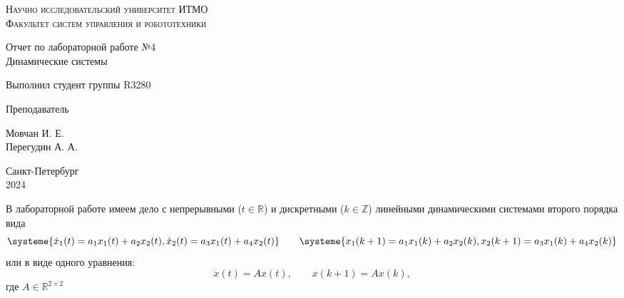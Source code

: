 \documentclass[a4paper,14pt]{extarticle}
\begin{document}
	\begin{titlepage}
		
		\setlength{\parindent}{0ex}
		
		\begin{center}
			\textsc{
				\vspace{1ex}
				Научно исследовательский университет ИТМО \\
				\vspace{0.5ex}
				Факультет систем управления и робототехники \\
				\vspace{0.5ex}
			}
		\end{center}
		
		\vspace{50mm}
		
		\begin{center}
			Отчет по лабораторной работе №4 \\
			Динамические системы
		\end{center}
		
		\vspace{50mm}
		
		\begin{minipage}{.55\linewidth}
			Выполнил студент группы R3280
			
			\smallskip
			
			Преподаватель
		\end{minipage}
		\hfill
		\begin{minipage}{.4\linewidth}
			\begin{flushright}
				Мовчан И. Е.
				\\
				Перегудин А. А.
			\end{flushright}
		\end{minipage}
		
		\vfill
		\begin{center}
			Санкт-Петербург
			\\
			2024
		\end{center}
		
	\end{titlepage}

	В лабораторной работе имеем дело с непрерывными ($t \in \mathbb{R}$) и дискретными ($k \in \mathbb{Z}$) линейными динамическими системами второго порядка вида
	\[
	\systeme{\dot{x} _1(t) = a_1 x_1(t) + a_2 x_2 (t), \dot{x} _2(t) = a_3 x_1 (t) + a_4 x_2 (t)}
	\quad \quad
	\systeme{x _1(k+1) = a_1x_1(k) + a_2x_2(k), x _2(k+1) = a_3 x_1(k) + a_4 x_2(k)}
	\]
	или в виде одного уравнения:
	\[
	\dot{x}(t) = Ax(t), \quad \quad x(k+1) = Ax(k),
	\]
	где $A \in \mathbb{R}^{2\times2}$
\end{document}
